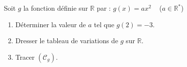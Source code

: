 \begin{Application}[][10 min]
Soit $g$ la fonction définie sur $\mathbb{R}$ par : $g(x) = ax^2$  ~ ($a \in \mathbb{R}^*$)
\begin{enumerate}
    \item Déterminer la valeur de $a$ tel que $g(2) = -3$.
    \item Dresser le tableau de variations de $g$ sur $\mathbb{R}$.
    \item Tracer $(\mathcal{C}_g)$.
\end{enumerate}
\end{Application}
